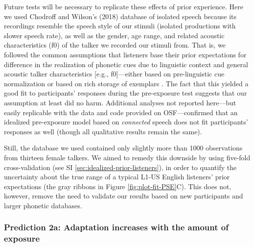\documentclass[
  11pt,
  man,mask,floatsintext]{apa6}
\providecommand{\DIFaddbegin}{} %
\providecommand{\DIFaddend}{} %
\providecommand{\DIFdelbegin}{} %
\providecommand{\DIFdelend}{} %
\newcommand{\DIFscaledelfig}{0.5}
\newlength{\DIFdelgraphicswidth} %
\newlength{\DIFdelgraphicsheight} %
\newcommand{\DIFaddincludegraphics}[2][]{{\color{blue}\fbox{\DIFOincludegraphics[#1]{#2}}}} %
\newcommand{\DIFdelincludegraphics}[2][]{%
\sbox{\DIFdelgraphicsbox}{\DIFOincludegraphics[#1]{#2}}%
\settoboxwidth{\DIFdelgraphicswidth}{\DIFdelgraphicsbox} %
\settoboxtotalheight{\DIFdelgraphicsheight}{\DIFdelgraphicsbox} %
\scalebox{\DIFscaledelfig}{%
\parbox[b]{\DIFdelgraphicswidth}{\usebox{\DIFdelgraphicsbox}\\[-\baselineskip] \rule{\DIFdelgraphicswidth}{0em}}\llap{\resizebox{\DIFdelgraphicswidth}{\DIFdelgraphicsheight}{%
\setlength{\unitlength}{\DIFdelgraphicswidth}%
\begin{picture}(1,1)%
\thicklines\linethickness{2pt} %
{\color[rgb]{1,0,0}\put(0,0){\framebox(1,1){}}}%
{\color[rgb]{1,0,0}\put(0,0){\line( 1,1){1}}}%
{\color[rgb]{1,0,0}\put(0,1){\line(1,-1){1}}}%
\end{picture}%
}\hspace*{3pt}}} %
} %
\DeclareRobustCommand{\DIFaddbegin}{\DIFOaddbegin \let\includegraphics\DIFaddincludegraphics} %
\DeclareRobustCommand{\DIFaddend}{\DIFOaddend \let\includegraphics\DIFOincludegraphics} %
\DeclareRobustCommand{\DIFdelbegin}{\DIFOdelbegin \let\includegraphics\DIFdelincludegraphics} %
\DeclareRobustCommand{\DIFdelend}{\DIFOaddend \let\includegraphics\DIFOincludegraphics} %
\begin{document}
Future tests will be necessary to replicate these effects of prior experience. Here we used Chodroff and Wilson's (2018) database of isolated speech because its recordings resemble the speech style of our stimuli (isolated productions with slower speech rate), as well as the gender, age range, and related acoustic characteristics (f0) of the talker we recorded our stimuli from. That is, we followed the common assumptions that listeners base their prior expectations for difference in the realization of phonetic cues due to linguistic context \autocites[e.g., speech rate, in line with][]{allen-miller1999,miller-dexter1988,utman1998} and general acoustic talker characteristics {[}e.g., f0{]}---either based on pre-linguistic cue normalization or based on rich storage of exemplars \DIFdelbegin %
\DIFdelend \DIFaddbegin \autocites[for relevant discussion, see][]{apfelbaum-mcmurray2015,baese-berk2014,dilley-pitt2010,johnson1997,johnson-sjerps2021,toscano-mcmurray2012}\DIFaddend . The fact that this yielded a good fit to participants' responses during the pre-exposure test suggests that our assumption at least did no harm. Additional analyses not reported here---but easily replicable with the data and code provided on OSF---confirmed that an idealized pre-exposure model based on \emph{connected} speech does not fit participants' responses as well (though all qualitative results remain the same).

Still, the database we used contained only slightly more than 1000 observations from thirteen female talkers. We aimed to remedy this downside by using five-fold cross-validation (see SI \ref{sec:idealized-prior-listeners}), in order to quantify the uncertainty about the true range of a typical L1-US English listeners' prior expectations (the gray ribbons in Figure \ref{fig:plot-fit-PSE}C). This does not, however, remove the need to validate our results based on new participants and larger phonetic databases.

\subsubsection{Prediction 2a: Adaptation increases with the amount of exposure}\label{prediction-2a-adaptation-increases-with-the-amount-of-exposure}
\end{document}
